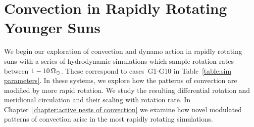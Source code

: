 %
%
%
%
%
%




\chapter{Convection in Rapidly Rotating Younger Suns}
\label{chapter:convection in G1-G10}







\label{sec:convection}

We begin our exploration of convection and dynamo action in rapidly
rotating suns with a series of hydrodynamic simulations which sample
rotation rates between $1-10\thinspace\Omega_\odot$.  These correspond
to cases~G1-G10 in Table~\ref{table:sim parameters}.  In these
systems, we explore how the patterns of convection are modified by
more rapid rotation.  We study the resulting differential rotation and
meridional circulation and their scaling with rotation rate.  In
Chapter~\ref{chapter:active nests of convection} we examine how novel
modulated patterns of convection arise in the most rapidly rotating
simulations.  

